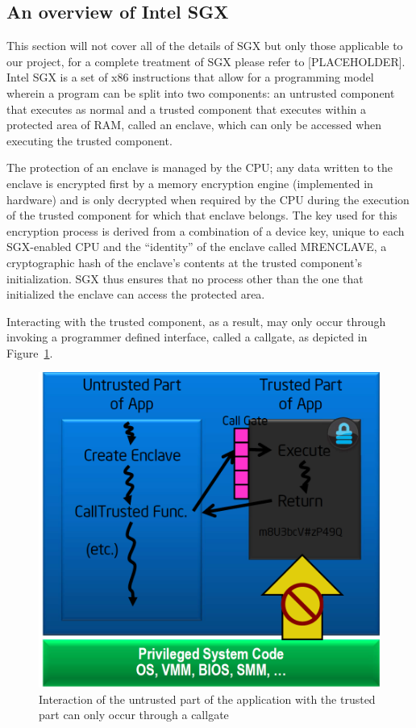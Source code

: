 \documentclass[../main.tex]{subfiles}
\begin{document}
\subsection{An overview of Intel SGX} %
This section will not cover all of the details of SGX but only those applicable to our project, for a complete treatment
of SGX please refer to [PLACEHOLDER]. Intel SGX is a set of x86 instructions that allow for a programming model wherein a
program can be split into two components: an untrusted component that executes as normal and a trusted component that executes
within a protected area of RAM, called an enclave, which can only be accessed when executing the trusted component. 

The protection of an enclave is managed by the CPU; any data written to the enclave is encrypted first by a memory encryption engine (implemented in hardware) 
and is only decrypted when required by the CPU during the execution of the trusted component for which that enclave belongs. The key used for this encryption process
is derived from a combination of a device key, unique to each SGX-enabled CPU and the ``identity'' of the enclave called MRENCLAVE, a cryptographic hash of the enclave's contents
at the trusted component's initialization. SGX thus ensures that no process other than the one that initialized the enclave can access the protected area. 

Interacting with the trusted component, as a result, may only occur through invoking a programmer defined interface, called a callgate, as depicted in Figure~\ref{fig:sgxhighlevel}.

\begin{figure}[H]
	\centering
	\includegraphics[scale=0.25]{images/sgxhighlevel.png}
	\caption{Interaction of the untrusted part of the application with the trusted part can only occur through a callgate}
	\label{fig:sgxhighlevel}
\end{figure}
\end{document}
